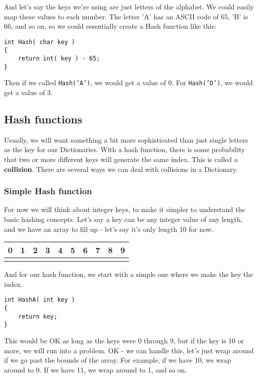 \documentclass[a4paper,12pt,oneside]{book}
\begin{document}
And let's say the keys we're using are just letters of the alphabet.
We could easily map these values to each number. The letter 'A' has an ASCII code of
65, 'B' is 66, and so on, so we could essentially create a Hash
function like this:

\begin{verbatim}
int Hash( char key )
{
    return int( key ) - 65;
}
\end{verbatim}

Then if we called \texttt{Hash('A')}, we would get a value of 0.
For \texttt{Hash('D')}, we would get a value of 3.

\subsection{Hash functions}

Usually, we will want something a bit more sophisticated than just
single letters as the key for our Dictionaries. With a hash
function, there is some probability that two or more different keys
will generate the same index. This is called a \textbf{collision}.
There are several ways we can deal with collisions in a Dictionary.

\subsubsection{Simple Hash function}

For now we will think about integer keys, to make it simpler to understand
the basic hashing concepts. Let's say a key can be any integer value
of any length, and we have an array to fill up - let's say it's only
length 10 for now.

\begin{center}
    \begin{tabular}{| c | c | c | c | c | c | c | c | c | c |}
        \hline
        0 & 1 & 2 & 3 & 4 & 5 & 6 & 7 & 8 & 9
        \\ \hline
        & & & & & & & & &
        \\ \hline
    \end{tabular}
\end{center}

And for our hash function, we start with a simple one where we make the
key the index.

\begin{verbatim}
int HashA( int key )
{
    return key;
}
\end{verbatim}

This would be OK as long as the keys were 0 through 9, but if the
key is 10 or more, we will run into a problem. OK - we can handle this,
let's just wrap around if we go past the bounds of the array. For example,
if we have 10, we wrap around to 0. If we have 11, we wrap around to 1,
and so on.
\end{document}
